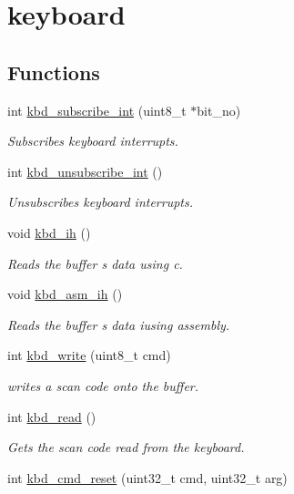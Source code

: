 \hypertarget{group__keyboard}{}\section{keyboard}
\label{group__keyboard}
\subsection*{Functions}
\begin{DoxyCompactItemize}
\item 
int \mbox{\hyperlink{group__keyboard_gaa7a491d4d95eab5ca5326c4000ad67f8}{kbd\+\_\+subscribe\+\_\+int}} (uint8\+\_\+t $\ast$bit\+\_\+no)
\begin{DoxyCompactList}\small\item\em Subscribes keyboard interrupts. \end{DoxyCompactList}\item 
int \mbox{\hyperlink{group__keyboard_ga5bdf6cfb570c375192b0d87913b65c57}{kbd\+\_\+unsubscribe\+\_\+int}} ()
\begin{DoxyCompactList}\small\item\em Unsubscribes keyboard interrupts. \end{DoxyCompactList}\item 
void \mbox{\hyperlink{group__keyboard_ga3b35eecf289446fe614818dd6ab6d5bf}{kbd\+\_\+ih}} ()
\begin{DoxyCompactList}\small\item\em Reads the buffer s data using c. \end{DoxyCompactList}\item 
void \mbox{\hyperlink{group__keyboard_gad89ba783e5c20d2626d7d68921339235}{kbd\+\_\+asm\+\_\+ih}} ()
\begin{DoxyCompactList}\small\item\em Reads the buffer s data iusing assembly. \end{DoxyCompactList}\item 
int \mbox{\hyperlink{group__keyboard_ga86798e38df77561e5a7a8d09fc28014b}{kbd\+\_\+write}} (uint8\+\_\+t cmd)
\begin{DoxyCompactList}\small\item\em writes a scan code onto the buffer. \end{DoxyCompactList}\item 
int \mbox{\hyperlink{group__keyboard_ga285ec963b858023390824480d3c5c531}{kbd\+\_\+read}} ()
\begin{DoxyCompactList}\small\item\em Gets the scan code read from the keyboard. \end{DoxyCompactList}\item 
int \mbox{\hyperlink{group__keyboard_ga7c34e9167923607131568a4ec42859a5}{kbd\+\_\+cmd\+\_\+reset}} (uint32\+\_\+t cmd, uint32\+\_\+t arg)
\end{DoxyCompactItemize}


